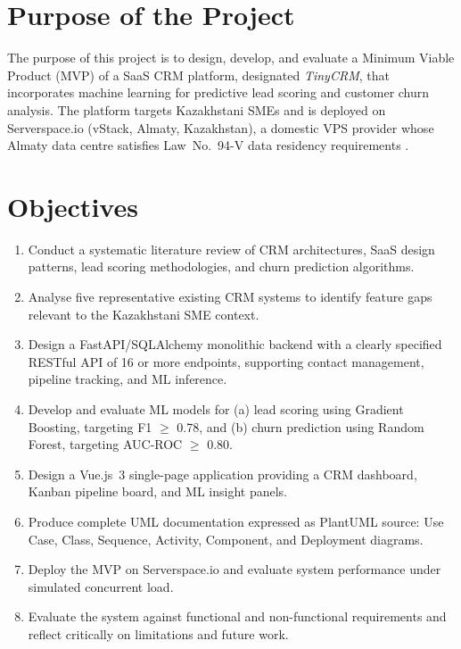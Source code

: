 \section{Purpose of the Project}

The purpose of this project is to design, develop, and evaluate a Minimum
Viable Product (MVP) of a SaaS CRM platform, designated \textit{TinyCRM},
that incorporates machine learning for predictive lead scoring and customer
churn analysis. The platform targets Kazakhstani SMEs and is deployed on
Serverspace.io (vStack, Almaty, Kazakhstan), a domestic VPS provider whose
Almaty data centre satisfies Law~No.~94-V data residency requirements
\citep{serverspacedocs2025,kazakhstanlaw94v}.

\section{Objectives}

\begin{enumerate}[label=\textbf{O\arabic*.}]
  \item Conduct a systematic literature review of CRM architectures, SaaS
  design patterns, lead scoring methodologies, and churn prediction algorithms.
  \item Analyse five representative existing CRM systems to identify feature
  gaps relevant to the Kazakhstani SME context.
  \item Design a FastAPI/SQLAlchemy monolithic backend with a clearly
  specified RESTful API of 16 or more endpoints, supporting contact
  management, pipeline tracking, and ML inference.
  \item Develop and evaluate ML models for (a) lead scoring using Gradient
  Boosting, targeting F1 $\geq$ 0.78, and (b) churn prediction using
  Random Forest, targeting AUC-ROC $\geq$ 0.80.
  \item Design a Vue.js~3 single-page application providing a CRM
  dashboard, Kanban pipeline board, and ML insight panels.
  \item Produce complete UML documentation expressed as PlantUML source:
  Use Case, Class, Sequence, Activity, Component, and Deployment diagrams.
  \item Deploy the MVP on Serverspace.io and evaluate system performance under
  simulated concurrent load.
  \item Evaluate the system against functional and non-functional
  requirements and reflect critically on limitations and future work.
\end{enumerate}

